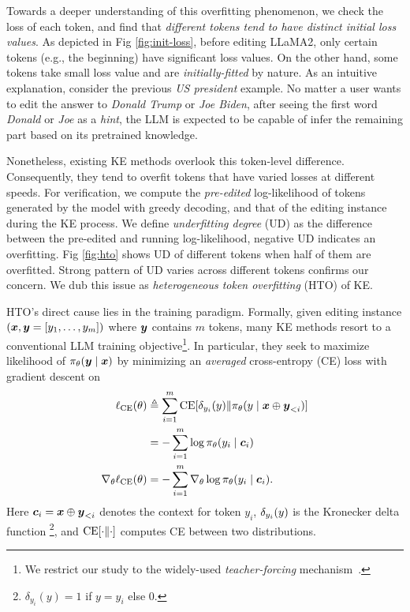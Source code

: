 % 
Towards a deeper understanding of this overfitting phenomenon, 
we check the loss of each token,
and find that \textit{different tokens tend to have distinct initial loss values}.
As depicted in Fig \ref{fig:init-loss}, 
{before} editing LLaMA2, only {certain} tokens (e.g., the beginning) have significant loss values. 
On the other hand, some tokens take small loss value and are \textit{initially-fitted} by nature.
As an intuitive explanation, consider the previous \textit{US president} example.
No matter a user wants to edit the answer to \textit{Donald Trump} or \textit{Joe Biden}, after seeing the first word \textit{Donald} or  \textit{Joe} as a \textit{hint}, 
the LLM is expected to be capable of infer the remaining part based on its pretrained knowledge. 

Nonetheless, 
existing KE methods overlook this token-level difference.
Consequently, they tend to overfit {tokens} that have varied losses at different speeds.
For verification, we compute the \textit{pre-edited} log-likelihood of tokens generated by the model with greedy decoding, and that of the editing instance during the KE process.
We define \textit{underfitting degree} (UD) as the difference between the pre-edited and running log-likelihood, negative UD indicates an overfitting.
Fig \ref{fig:hto} shows UD of different tokens when half of them are overfitted. 
Strong pattern of UD varies across different tokens confirms our concern. 
We dub this issue as \textit{heterogeneous token overfitting} (HTO) of KE.

\setlength{\intextsep}{12pt} %
\setlength{\columnsep}{20pt} %


HTO's direct cause lies in the training paradigm.
Formally, given editing instance $(\boldsymbol{x}, \boldsymbol{y} = [y_1, \dots, y_m])$ where $\boldsymbol{y}$ contains $m$ tokens, 
many KE methods resort to a conventional LLM training objective\footnote{We restrict our study to the widely-used \textit{teacher-forcing} mechanism~\citep{lamb2016professor}.}.
In particular, they seek to maximize likelihood of $\pi_\theta (\boldsymbol{y} \mid \boldsymbol{x})$ by minimizing an \textit{averaged} cross-entropy (CE) loss with gradient descent on
\begin{align}
\label{eq:ce-loss}
\ell_{\ce}(\theta) 
&\triangleq
\sum_{i=1}^m \ce[\de{y_i}{y} \| \pi_\theta(y \mid \xv \oplus \yv_{<i} )] \\
&= 
-\sum_{i=1}^m  \log \pi_\theta (y_i \mid \cv_i) \notag \\ 
\notag 
\nabla_\theta \ell_\ce(\theta) 
&=
- \sum_{i=1}^m \nabla_\theta \log \pil (y_i \mid \cv_i). 
\end{align}
% 
Here ${\boldsymbol{c}}_i = \boldsymbol{x} \oplus \boldsymbol{y}_{<i}$ denotes the context for token $y_i$, $\de{y_i}{y}$ is the Kronecker delta function%
\footnote{$\delta_{y_i}(y) = 1$ if $y=y_i$ else 0.},
and $\text{CE}[\cdot \| \cdot]$ computes CE between two distributions. 

